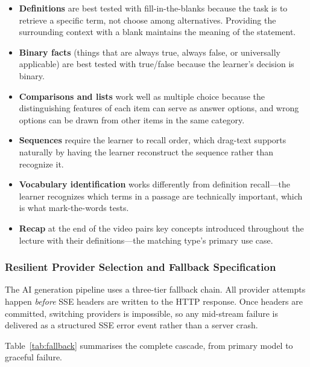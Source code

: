 \begin{itemize}
  \item \textbf{Definitions} are best tested with fill-in-the-blanks because the task is to retrieve a specific term, not choose among alternatives. Providing the surrounding context with a blank maintains the meaning of the statement.
  \item \textbf{Binary facts} (things that are always true, always false, or universally applicable) are best tested with true/false because the learner's decision is binary.
  \item \textbf{Comparisons and lists} work well as multiple choice because the distinguishing features of each item can serve as answer options, and wrong options can be drawn from other items in the same category.
  \item \textbf{Sequences} require the learner to recall order, which drag-text supports naturally by having the learner reconstruct the sequence rather than recognize it.
  \item \textbf{Vocabulary identification} works differently from definition recall---the learner recognizes which terms in a passage are technically important, which is what mark-the-words tests.
  \item \textbf{Recap} at the end of the video pairs key concepts introduced throughout the lecture with their definitions---the matching type's primary use case.
\end{itemize}

\subsubsection{Resilient Provider Selection and Fallback Specification}

The AI generation pipeline uses a three-tier fallback chain. All provider attempts happen \emph{before} SSE headers are written to the HTTP response. Once headers are committed, switching providers is impossible, so any mid-stream failure is delivered as a structured SSE error event rather than a server crash.

Table~\ref{tab:fallback} summarises the complete cascade, from primary model to graceful failure.

